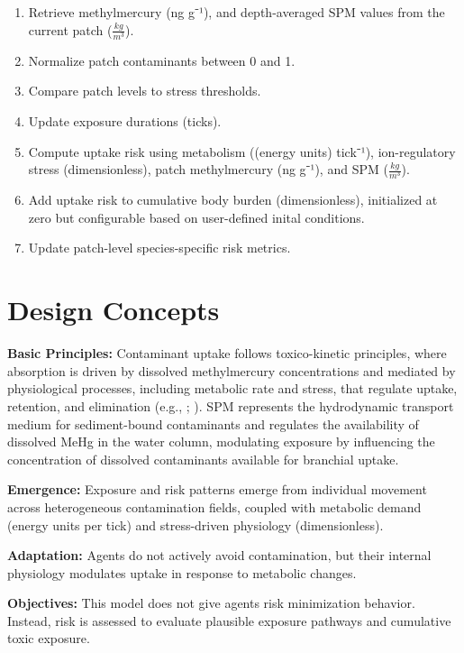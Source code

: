 \documentclass[
]{book}
\begin{document}
\begin{enumerate}
\def\labelenumi{\arabic{enumi}.}
\item
  Retrieve methylmercury (ng g⁻¹), and depth-averaged SPM values from
  the current patch (\(\frac{kg}{m^3}\)).
\item
  Normalize patch contaminants between 0 and 1.
\item
  Compare patch levels to stress thresholds.
\item
  Update exposure durations (ticks).
\item
  Compute uptake risk using metabolism ((energy units) tick⁻¹),
  ion-regulatory stress (dimensionless), patch methylmercury (ng g⁻¹),
  and SPM (\(\frac{kg}{m^3}\)).
\item
  Add uptake risk to cumulative body burden (dimensionless),
  initialized at zero but configurable based on user-defined inital
  conditions.
\item
  Update patch-level species-specific risk metrics.
\end{enumerate}

\section{Design Concepts}\label{design-concepts-4}

\textbf{Basic Principles:} Contaminant uptake follows toxico-kinetic
principles, where absorption is driven by dissolved methylmercury
concentrations and mediated by physiological processes, including
metabolic rate and stress, that regulate uptake, retention, and
elimination (e.g., \citet{wang_bioaccumulation_2003};
\citet{trudel_bioenergetics_2006}). SPM represents the hydrodynamic transport
medium for sediment-bound contaminants and regulates the availability of
dissolved MeHg in the water column, modulating exposure by influencing
the concentration of dissolved contaminants available for branchial
uptake.

\textbf{Emergence:} Exposure and risk patterns emerge from individual
movement across heterogeneous contamination fields, coupled with
metabolic demand (energy units per tick) and stress-driven physiology
(dimensionless).

\textbf{Adaptation:} Agents do not actively avoid contamination, but their
internal physiology modulates uptake in response to metabolic changes.

\textbf{Objectives:} This model does not give agents risk minimization
behavior. Instead, risk is assessed to evaluate plausible exposure
pathways and cumulative toxic exposure.
\end{document}
